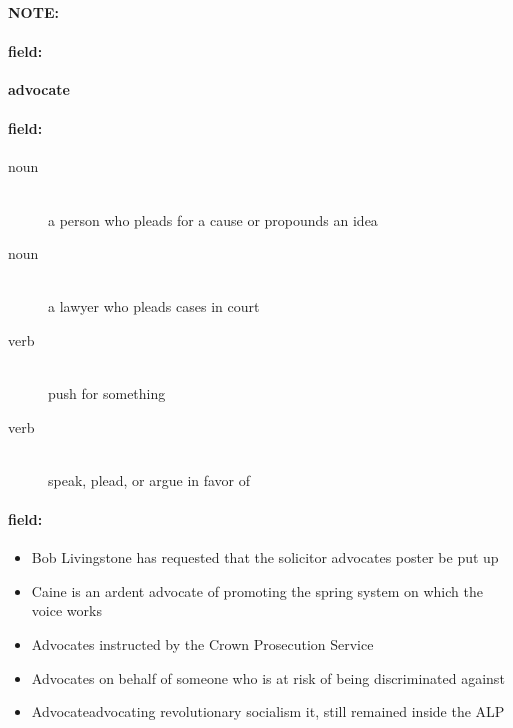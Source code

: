 \documentclass[12pt]{article}
\newenvironment{note}{\paragraph{NOTE:}}{}
\newenvironment{field}{\paragraph{field:}}{}
\begin{document}
\begin{note}
\begin{field}
\textbf{\large advocate}
\end{field}


\begin{field}
\begin{description}
\item[noun] \hfill \\ 
a person who pleads for a cause or propounds an idea

\item[noun] \hfill \\ 
a lawyer who pleads cases in court

\item[verb] \hfill \\ 
push for something

\item[verb] \hfill \\ 
speak, plead, or argue in favor of

\end{description}
\end{field}

\begin{field}
\begin{itemize}
\item Bob Livingstone has requested that the solicitor advocates poster be put up
\item Caine is an ardent advocate of promoting the spring system on which the voice works
\item Advocates instructed by the Crown Prosecution Service 
\item Advocates on behalf of someone who is at risk of being discriminated against
\item Advocateadvocating revolutionary socialism it, still remained inside the ALP
\end{itemize}
\end{field}
\end{note}
\end{document}
